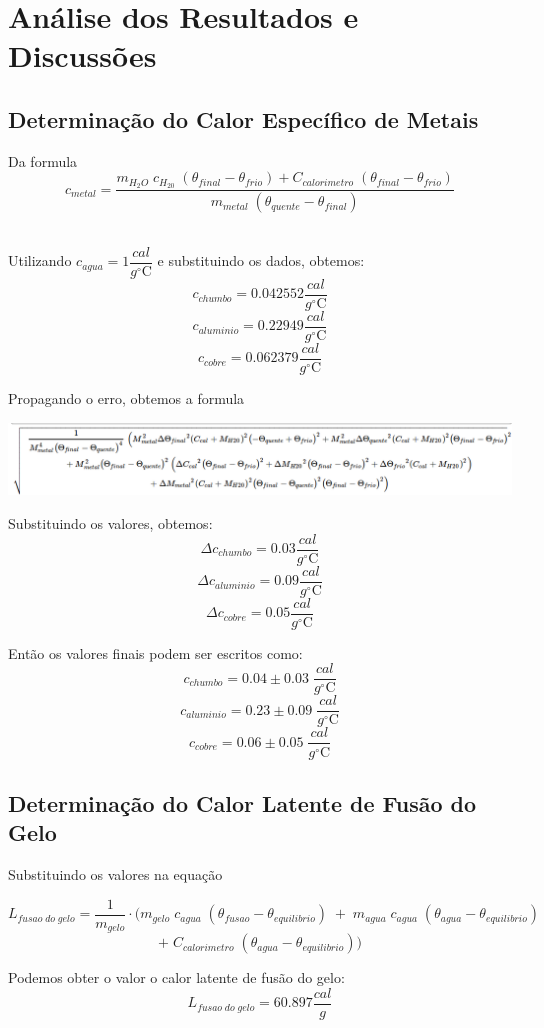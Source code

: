 \documentclass[12pt,a4paper]{article}
\begin{document}
\section{Análise dos Resultados e Discussões}

\subsection{Determinação do Calor Específico de Metais}
Da formula 
$$c_{metal} = \frac{m_{H_2O} \; c_{H_20} \;  (\theta_{final} - \theta_{frio}) + C_{calorimetro} \; (\theta_{final} - \theta_{frio})}{m_{metal} \;(\theta_{quente} - \theta_{final})}$$\

Utilizando $c_{agua} = 1 \dfrac{cal}{g^{\circ}\mathrm{C}}$ e substituindo os dados, obtemos:
$$ c_{chumbo} = 0.042552 \dfrac{cal}{g^{\circ}\mathrm{C}}$$
$$ c_{aluminio} = 0.22949 \dfrac{cal}{g^{\circ}\mathrm{C}}$$
$$ c_{cobre} = 0.062379 \dfrac{cal}{g^{\circ}\mathrm{C}}$$

\newpage
Propagando o erro, obtemos a formula 

\includegraphics[scale=0.45]{formula.png}

Substituindo os valores, obtemos:
$$ \Delta c_{chumbo} = 0.03 \dfrac{cal}{g^{\circ}\mathrm{C}}$$
$$ \Delta c_{aluminio} = 0.09 \dfrac{cal}{g^{\circ}\mathrm{C}}$$
$$ \Delta c_{cobre} = 0.05 \dfrac{cal}{g^{\circ}\mathrm{C}}$$

Então os valores finais podem ser escritos como:
$$ c_{chumbo} = 0.04 \pm 0.03 \; \dfrac{cal}{g^{\circ}\mathrm{C}}$$
$$ c_{aluminio} = 0.23 \pm 0.09 \; \dfrac{cal}{g^{\circ}\mathrm{C}}$$
$$ c_{cobre} = 0.06 \pm 0.05 \; \dfrac{cal}{g^{\circ}\mathrm{C}}$$


\subsection{Determinação do Calor Latente de Fusão do Gelo}
Substituindo os valores na equação 

$$L_{fusao\;do\;gelo} = \frac{1}{m_{gelo}} \cdot (m_{gelo} \; c_{agua} \; (\theta_{fusao} - \theta_{equilibrio}) \; + \; m_{agua} \; c_{agua} \; (\theta_{agua} - \theta_{equilibrio}) \;$$ 
$$ + \; C_{calorimetro} \; (\theta_{agua} - \theta_{equilibrio}))$$

Podemos obter o valor o calor latente de fusão do gelo:
$$ L_{fusao\;do\;gelo} = 60.897 \dfrac{cal}{g}$$
\end{document}
